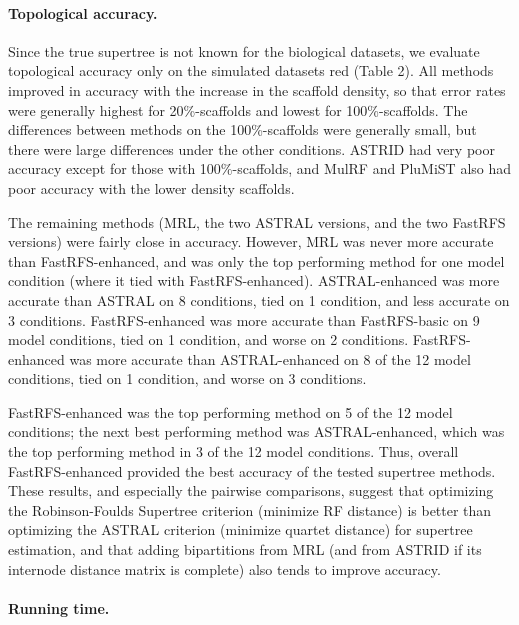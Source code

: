 \paragraph{Topological accuracy.  }
Since the true supertree is not known for the biological datasets, 
we evaluate topological accuracy only on the simulated datasets
red
(Table 2).
All methods improved in accuracy with the increase
in the scaffold density, so that error rates were
generally highest for 20\%-scaffolds and lowest
for 100\%-scaffolds.
The differences between methods on the 100\%-scaffolds
were generally small, but there were large differences
under the other conditions.
ASTRID had very 
poor accuracy except for those with
100\%-scaffolds, and MulRF and PluMiST also
had poor accuracy with the lower density scaffolds.

The remaining methods (MRL, the two ASTRAL versions, and the
two FastRFS versions)
were fairly close in accuracy.
However, MRL was never more
accurate than FastRFS-enhanced, and was only the top
performing method for one model condition 
(where
it tied with FastRFS-enhanced).
ASTRAL-enhanced was more accurate than ASTRAL on 8 conditions,
tied on 1 condition, and less accurate on 3 conditions.
FastRFS-enhanced was more accurate
than FastRFS-basic on 9 model conditions,
tied on 1 condition, and worse on 2 conditions.
FastRFS-enhanced was more accurate than
ASTRAL-enhanced on 8 
of the 12 model conditions, tied on
1 condition, and worse on 3 conditions.

FastRFS-enhanced was the
top performing method on 5 of the 
12
model conditions; the next
best performing method
was ASTRAL-enhanced, which was the top
performing method in 3 of the 12 model conditions.
Thus, overall FastRFS-enhanced provided
the best accuracy of the tested supertree methods.
These results, and especially the
pairwise comparisons,  suggest that
optimizing the Robinson-Foulds Supertree
criterion (minimize RF distance) is better than
optimizing the ASTRAL criterion (minimize
quartet distance) for supertree estimation, and
that adding bipartitions from MRL (and 
from ASTRID if its internode distance matrix
is complete) also tends to improve accuracy.

\paragraph{Running time. } 





